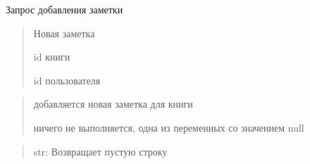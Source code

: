 \documentclass[letterpaper,10pt,russian]{sphinxmanual}
\begin{document}
\begin{fulllineitems}
\label{\detokenize{blueprints:blueprints.book_read.add_note}}
\pysigstartsignatures
{}
\pysigstopsignatures
\sphinxAtStartPar
Запрос добавления заметки
\begin{description}
\begin{quote}\begin{description}
\sphinxAtStartPar
Новая заметка

\sphinxAtStartPar
id книги

\sphinxAtStartPar
id пользователя

\end{description}\end{quote}

\begin{quote}\begin{description}
\sphinxAtStartPar
добавляется новая заметка для книги

\sphinxAtStartPar
ничего не выполняется, одна из переменных со значением null

\end{description}\end{quote}

\end{description}
\begin{quote}\begin{description}
\sphinxAtStartPar
str: Возвращает пустую строку

\end{description}\end{quote}

\end{fulllineitems}

\end{document}
